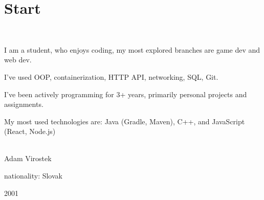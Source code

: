 \documentclass[pastel]{simplehipstercv}
\begin{document}
\pagestyle{empty}

\section*{Start}


\vspace{6em}

\setlength{\columnsep}{1cm}
\begin{paracol}{2}

    \footnotesize

    \flushleft

    \bigskip


    \bigskip


    \bigskip

    \\[0.5em]

    {\footnotesize
    I am a student, who enjoys coding, my most explored branches are game dev and web dev.

    I've used OOP, containerization, HTTP API, networking, SQL, Git.

    I've been actively programming for 3+ years, primarily personal projects and assignments.

    My most used technologies are: Java (Gradle, Maven), C++, and JavaScript (React, Node.js)
    }
    \bigskip

     \\[0.5em]
    Adam Virostek

    nationality: Slovak

    2001

    \bigskip


\end{paracol}
\end{document}
